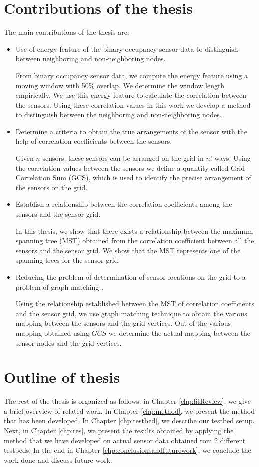 \section{Contributions of the thesis}
The main contributions of the thesis are:
\begin{itemize}
\item Use of energy feature of the binary occupancy sensor data to distinguish between neighboring and non-neighboring nodes.\par
From binary occupancy sensor data, we compute the energy feature using a moving window with 50\% overlap.
We determine the window length empirically. 
We use this energy feature to calculate the correlation between the sensors.
 Using these correlation values in this work we develop a method to distinguish between the neighboring and non-neighboring nodes.
\item Determine a criteria to obtain the true arrangements of the sensor with the help of correlation coefficients between the sensors.\par
Given $n$ sensors, these sensors can be arranged on the grid in $n!$ ways. Using the correlation values between the sensors we define a quantity called Grid Correlation Sum (GCS), which is used to identify the precise arrangement of the sensors on the grid.
\item Establish a relationship between the correlation coefficients among the sensors and the sensor grid.\par
In this thesis, we show that there exists a relationship between the maximum spanning tree (MST) obtained from the correlation coefficient between all the sensors and the sensor grid. We show that the MST represents one of the spanning trees for the sensor grid.
\item Reducing the problem of determination of sensor locations  on the grid to a problem of graph matching \cite{conte2004thirty}.\par
 Using the relationship established between the MST of correlation coefficients and the sensor grid, we use graph matching technique to obtain the various mapping between the sensors and the grid vertices. Out of the various mapping obtained using $GCS$ we determine the actual mapping  between the sensor nodes and the grid vertices.
\end{itemize}

\section{Outline of thesis}

The rest of the thesis is organized as follows: in Chapter \ref{chp:litReview}, we give a brief overview of related work. In Chapter \ref{chp:method}, we present the method that has been developed. In Chapter \ref{chp:testbed}, we describe our testbed setup. Next, in Chapter \ref{chp:res}, we present the results obtained by applying the method that we have developed on actual sensor data obtained rom 2 different testbeds. In the end in Chapter \ref{chp:conclusionsandfuturework}, we conclude the work done and discuss future work.




